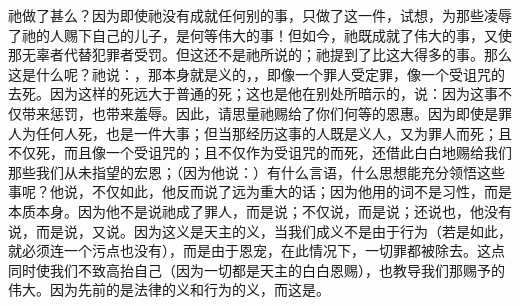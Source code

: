 祂做了甚么？因为即使祂没有成就任何别的事，只做了这一件，试想，为那些凌辱了祂的人赐下自己的儿子，是何等伟大的事！但如今，祂既成就了伟大的事，又使那无辜者代替犯罪者受罚。但这还不是祂所说的；祂提到了比这大得多的事。那么这是什么呢？祂说：，那本身就是义的，，即像一个罪人受定罪，像一个受诅咒的去死。因为这样的死远大于普通的死；这也是他在别处所暗示的，说：因为这事不仅带来惩罚，也带来羞辱。因此，请思量祂赐给了你们何等的恩惠。因为即使是罪人为任何人死，也是一件大事；但当那经历这事的人既是义人，又为罪人而死；且不仅死，而且像一个受诅咒的；且不仅作为受诅咒的而死，还借此白白地赐给我们那些我们从未指望的宏恩；（因为他说：）有什么言语，什么思想能充分领悟这些事呢？他说，不仅如此，他反而说了远为重大的话；因为他用的词不是习性，而是本质本身。因为他不是说祂成了罪人，而是说；不仅说，而是说；还说也，他没有说，而是说，又说。因为这义是天主的义，当我们成义不是由于行为（若是如此，就必须连一个污点也没有），而是由于恩宠，在此情况下，一切罪都被除去。这点同时使我们不致高抬自己（因为一切都是天主的白白恩赐），也教导我们那赐予的伟大。因为先前的是法律的义和行为的义，而这是。\par

